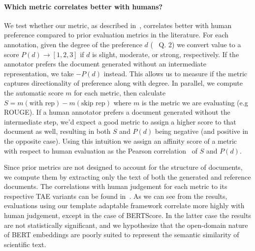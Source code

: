 

\paragraph{Which metric correlates better with humans?} We test whether our metric, as described in~, correlates better with human preference compared to prior evaluation metrics in the literature.
For each annotation, given the degree of the preference $d$ (~ Q. 2) we convert value to a score $P(d) \rightarrow [1,2,3]$ if $d$ is slight, moderate, or strong, respectively. 
If the annotator prefers the document generated without an intermediate representation, we take $-P(d)$ instead. This allows us to measure if the metric captures directionality of preference along with degree. In parallel, we compute the automatic score $m$ for each metric, then calculate
$S =m(\textrm{with rep}) - m(\textrm{skip rep})$
where $m$ is the metric we are evaluating (e.g ROUGE). If a human annotator prefers a document generated without the intermediate step, we'd expect a good metric to assign a higher score to that document as well, resulting in both $S$ and $P(d)$ being negative (and positive in the opposite case). %
Using this intuition we assign an affinity score of a metric with respect to human evaluation as the Pearson correlation~\cite{freedman2007statistics} of $S$ and $P(d)$.

Since prior metrics are not designed to account for the structure of documents, we compute them by extracting only the text of both the generated and reference documents. The correlations with human judgement for each metric to its respective TAE variants can be found in~. As we can see from the results, evaluations using our template adaptable framework correlate more highly with human judgement, except in the case of BERTScore. In the latter case the results are not statistically significant, and we hypothesize that the open-domain nature of BERT embeddings are poorly suited to represent the semantic similarity of scientific text.


